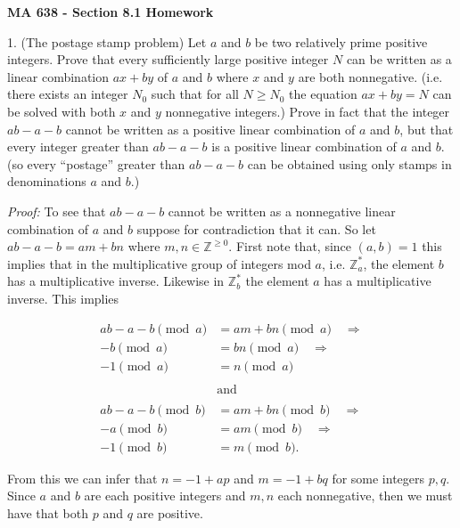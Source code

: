\documentclass[11pt]{article}
\def\noin{\noindent}
\begin{document}
\thispagestyle{empty}
%
%


\large
\noin \textbf{MA 638 - Section 8.1 Homework}\\


\normalsize

1. (The postage stamp problem)  Let $a$ and $b$ be two relatively prime positive integers.  Prove that every sufficiently large positive integer $N$ can be written as a linear combination $ax+by$ of $a$ and $b$ where $x$ and $y$ are both nonnegative.  (i.e.  there exists an integer $N_0$ such that for all $N\ge N_0$ the equation $ax+by=N$ can be solved with both $x$ and $y$ nonnegative integers.)  Prove in fact that the integer $ab-a-b$ cannot be written as a positive linear combination of $a$ and $b$, but that every integer greater than $ab-a-b$ is a positive linear combination of $a$ and $b$.  (so every ``postage'' greater than $ab-a-b$ can be obtained using only stamps in denominations $a$ and $b$.)

{\it Proof:} To see that $ab-a-b$ cannot be written as a nonnegative linear combination of $a$ and $b$ suppose for contradiction that it can.  So let $ab-a-b = am+bn$ where $m,n\in\mathbb Z^{\geq 0}$. First note that, since $(a,b)=1$ this implies that in the multiplicative group of integers mod $a$, i.e. $\mathbb Z_a^*$, the element $b$ has a multiplicative inverse.  Likewise in $\mathbb Z_b^*$ the element $a$ has a multiplicative inverse. This implies 

\begin{align*}
    ab-a-b \pmod a &= am + bn \pmod a \quad \Rightarrow \\
    -b \pmod a &= bn \pmod a \quad \Rightarrow \\
    -1 \pmod a &= n\pmod a \\\\
    &\text{and}\\\\
    ab-a-b \pmod b &= am+bn \pmod b \quad \Rightarrow \\
    -a \pmod b &= am \pmod b \quad \Rightarrow \\
    -1 \pmod b &= m \pmod b.
\end{align*}

From this we can infer that $n = -1+ap$ and $m=-1+bq$ for some integers $p,q$.  Since $a$ and $b$ are each positive integers and $m,n$ each nonnegative, then we must have that both $p$ and $q$ are positive.  
\end{document}
